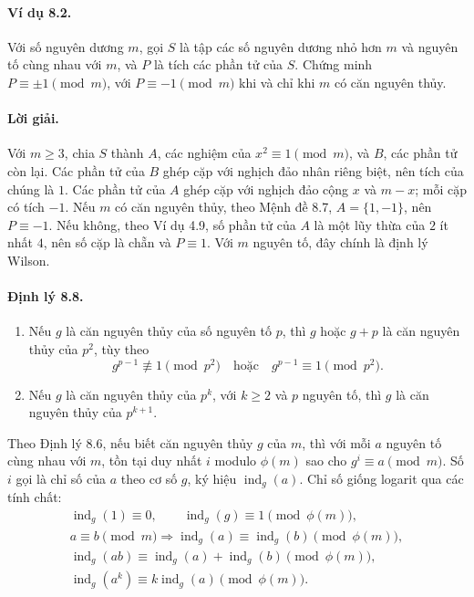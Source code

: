 \documentclass[11pt]{article}
\DeclareMathOperator{\ind}{ind}
\begin{document}
\paragraph{Ví dụ 8.2.}
Với số nguyên dương \(m\), gọi \(S\) là tập các số nguyên dương nhỏ hơn \(m\)
và nguyên tố cùng nhau với \(m\), và \(P\) là tích các phần tử của \(S\). Chứng
minh \(P\equiv\pm1\pmod m\), với \(P\equiv-1\pmod m\) khi và chỉ khi \(m\) có
căn nguyên thủy.

\paragraph{Lời giải.}
Với \(m\ge3\), chia \(S\) thành \(A\), các nghiệm của \(x^2\equiv1\pmod m\),
và \(B\), các phần tử còn lại. Các phần tử của \(B\) ghép cặp với nghịch đảo
nhân riêng biệt, nên tích của chúng là \(1\). Các phần tử của \(A\) ghép cặp
với nghịch đảo cộng \(x\) và \(m-x\); mỗi cặp có tích \(-1\). Nếu \(m\) có căn
nguyên thủy, theo Mệnh đề 8.7, \(A=\{1,-1\}\), nên \(P\equiv-1\). Nếu không,
theo Ví dụ 4.9, số phần tử của \(A\) là một lũy thừa của \(2\) ít nhất \(4\),
nên số cặp là chẵn và \(P\equiv1\). Với \(m\) nguyên tố, đây chính là định lý
Wilson.

\paragraph{Định lý 8.8.}
\begin{enumerate}
\item Nếu \(g\) là căn nguyên thủy của số nguyên tố \(p\), thì \(g\) hoặc
\(g+p\) là căn nguyên thủy của \(p^2\), tùy theo
\[
 g^{p-1}\not\equiv1\pmod{p^2}
 \quad\text{hoặc}\quad
 g^{p-1}\equiv1\pmod{p^2}.
\]
\item Nếu \(g\) là căn nguyên thủy của \(p^k\), với \(k\ge2\) và \(p\) nguyên
tố, thì \(g\) là căn nguyên thủy của \(p^{k+1}\).
\end{enumerate}

Theo Định lý 8.6, nếu biết căn nguyên thủy \(g\) của \(m\), thì với mỗi \(a\)
nguyên tố cùng nhau với \(m\), tồn tại duy nhất \(i\) modulo \(\phi(m)\) sao
cho \(g^i\equiv a\pmod m\). Số \(i\) gọi là chỉ số của \(a\) theo cơ số \(g\),
ký hiệu \(\ind_g(a)\). Chỉ số giống logarit qua các tính chất:
\[
\begin{gathered}
\ind_g(1)\equiv0,\qquad \ind_g(g)\equiv1\pmod{\phi(m)},\\
a\equiv b\pmod m\Rightarrow \ind_g(a)\equiv\ind_g(b)\pmod{\phi(m)},\\
\ind_g(ab)\equiv\ind_g(a)+\ind_g(b)\pmod{\phi(m)},\\
\ind_g(a^k)\equiv k\ind_g(a)\pmod{\phi(m)}.
\end{gathered}
\]
\end{document}

